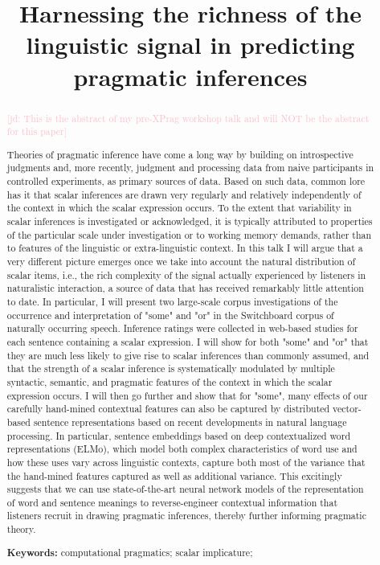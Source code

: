 \documentclass[10pt,letterpaper]{article}
\title{Harnessing the richness of the linguistic signal in predicting pragmatic inferences }
\newcommand{\jd}[1]{\textcolor{Pink}{[jd: #1]}}
\begin{document}
\maketitle


\begin{abstract}
  
\jd{This is the abstract of my pre-XPrag workshop talk and will NOT be the abstract for this paper}

Theories of pragmatic inference have come a long way by building on introspective judgments and, more recently, judgment and processing data from naive participants in controlled experiments, as primary sources of data. Based on such data, common lore has it that scalar inferences are drawn very regularly and relatively independently of the context in which the scalar expression occurs. To the extent that variability in scalar inferences is investigated or acknowledged, it is typically attributed to properties of the particular scale under investigation or to working memory demands, rather than to features of the linguistic or extra-linguistic context.
In this talk I will argue that a very different picture emerges once we take into account the natural distribution of scalar items, i.e., the rich complexity of the signal actually experienced by listeners in naturalistic interaction, a source of data that has received remarkably little attention to date. In particular, I will present two large-scale corpus investigations of the occurrence and interpretation of "some" and "or" in the Switchboard corpus of naturally occurring speech. Inference ratings were collected in web-based studies for each sentence containing a scalar expression. I will show for both "some" and "or" that they are much less likely to give rise to scalar inferences than commonly assumed, and that the strength of a scalar inference is systematically modulated by multiple syntactic, semantic, and pragmatic features of the context in which the scalar expression occurs.
I will then go further and show that for "some", many effects of our carefully hand-mined contextual features can also be captured by distributed vector-based sentence representations based on recent developments in natural language processing. In particular, sentence embeddings based on deep contextualized word representations (ELMo), which model both complex characteristics of word use and how these uses vary across linguistic contexts, capture both most of the variance that the hand-mined features captured as well as additional variance. This excitingly suggests that we can use state-of-the-art neural network models of the representation of word and sentence meanings to reverse-engineer contextual information that listeners recruit in drawing pragmatic inferences, thereby further informing pragmatic theory.

\textbf{Keywords:} 
computational pragmatics; scalar implicature;
\end{abstract}
\end{document}
